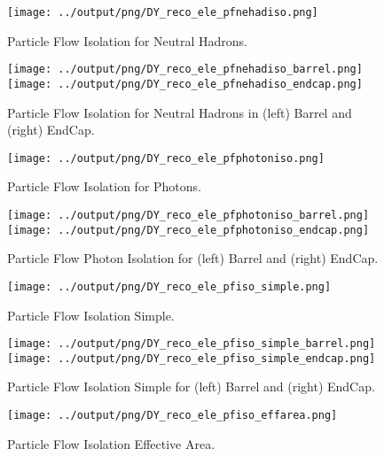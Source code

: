\documentclass[11pt]{book}
\begin{document}
\begin{figure}[ht]
\centering
\texttt{[image: ../output/png/DY\_reco\_ele\_pfnehadiso.png]}
\caption{Particle Flow Isolation for Neutral Hadrons.}
\label{fig:dy_reco_ele_pfnehadiso}
\end{figure}

\begin{figure}[ht]
\centering
\texttt{[image: ../output/png/DY\_reco\_ele\_pfnehadiso\_barrel.png]}
\texttt{[image: ../output/png/DY\_reco\_ele\_pfnehadiso\_endcap.png]}
\caption{Particle Flow Isolation for Neutral Hadrons in (left) Barrel and (right) EndCap.}
\label{fig:dy_reco_ele_pfnehadiso_regions}
\end{figure}

\begin{figure}[ht]
\centering
\texttt{[image: ../output/png/DY\_reco\_ele\_pfphotoniso.png]}
\caption{Particle Flow Isolation for Photons.}
\label{fig:dy_reco_ele_pfphotoniso}
\end{figure}

\begin{figure}[ht]
\centering
\texttt{[image: ../output/png/DY\_reco\_ele\_pfphotoniso\_barrel.png]}
\texttt{[image: ../output/png/DY\_reco\_ele\_pfphotoniso\_endcap.png]}
\caption{Particle Flow Photon Isolation for (left) Barrel and (right) EndCap.}
\label{fig:dy_reco_ele_pfphotoniso_regions}
\end{figure}

\begin{figure}[ht]
\centering
\texttt{[image: ../output/png/DY\_reco\_ele\_pfiso\_simple.png]}
\caption{Particle Flow Isolation Simple.}
\label{fig:dy_reco_ele_pfiso_simple}
\end{figure}

\begin{figure}[ht]
\centering
\texttt{[image: ../output/png/DY\_reco\_ele\_pfiso\_simple\_barrel.png]}
\texttt{[image: ../output/png/DY\_reco\_ele\_pfiso\_simple\_endcap.png]}
\caption{Particle Flow Isolation Simple for (left) Barrel and (right) EndCap.}
\label{fig:dy_reco_ele_pfiso_simple_regions}
\end{figure}


\begin{figure}[ht]
\centering
\texttt{[image: ../output/png/DY\_reco\_ele\_pfiso\_effarea.png]}
\caption{Particle Flow Isolation Effective Area.}
\label{fig:dy_reco_ele_pfiso_effarea}
\end{figure}
\end{document}
